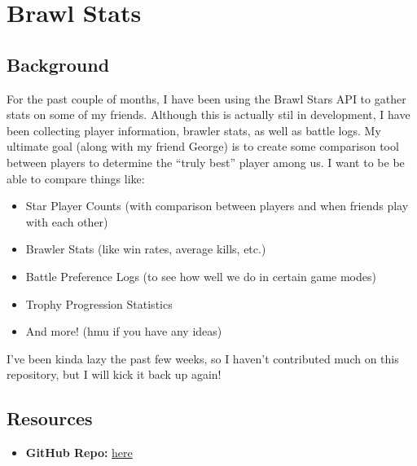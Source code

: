 \section{Brawl Stats}
\subsection{Background}
For the past couple of months, I have been using the Brawl Stars API to gather stats on some of my friends. Although this is actually stil in development, I have been collecting player information, brawler stats, as well as battle logs. My ultimate goal (along with my friend George) is to create some comparison tool between players to determine the ``truly best'' player among us. I want to be be able to compare things like:
\begin{itemize}
    \item Star Player Counts (with comparison between players and when friends play with each other)
    \item Brawler Stats (like win rates, average kills, etc.)
    \item Battle Preference Logs (to see how well we do in certain game modes)
    \item Trophy Progression Statistics
    \item And more! (hmu if you have any ideas)
\end{itemize}
I've been kinda lazy the past few weeks, so I haven't contributed much on this repository, but I will kick it back up again!
\subsection{Resources}
\begin{itemize}
    \item \textbf{GitHub Repo:} \href{https://github.com/connorli18/brawl-stats}{here}
\end{itemize}
